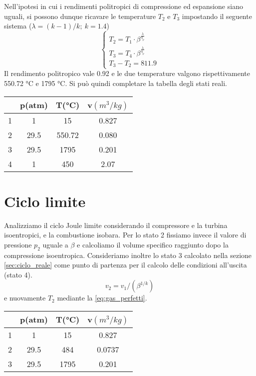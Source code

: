 \documentclass[a4paper,12pt]{article}
\begin{document}
Nell'ipotesi in cui i rendimenti politropici di compressione ed espansione siano uguali, si possono dunque ricavare le temperature $T_2$ e $T_3$ impostando il seguente sistema
($\lambda = (k-1)/k;\ k=1.4$)
$$
\begin{cases}
    T_2 = T_1\cdot\beta^{\frac{\lambda}{\eta_p}} \\
    T_3 = T_4\cdot\beta^{\frac{\lambda}{\eta_p}}\\
    T_3-T_2 = 811.9
\end{cases}
$$
Il rendimento politropico vale 0.92 e le due temperature valgono rispettivamente 550.72 °C e 1795 °C.
Si può quindi completare la tabella degli stati reali.
\begin{center}
    \begin{tabular}{c|c|c|c}
            &p(atm) &T(°C)  &v$(m^3/kg)$     \\ \hline
        1   &    1  & 15    & 0.827   \\
        2   &   29.5&550.72 & 0.080   \\
        3   &   29.5&1795   & 0.201   \\
        4   &   1   & 450   & 2.07
    \end{tabular}
\end{center}

\section{Ciclo limite}
\label{sec:ciclo_limite}
Analizziamo il ciclo Joule limite considerando il compressore e la turbina isoentropici, e la combustione isobara.
Per lo stato 2 fissiamo invece il valore di pressione $p_2$ uguale a $\beta$ e calcoliamo il volume specifico raggiunto dopo la compressione isoentropica.
Consideriamo inoltre lo stato 3 calcolato nella sezione \ref{sec:ciclo_reale} come punto di partenza per il calcolo delle condizioni all'uscita (stato 4).
\begin{equation*}
    v_2 = v_1/(\beta^{1/k})
\end{equation*}
e nuovamente $T_2$ mediante la \eqref{eq:gas_perfetti}.
\begin{center}
    \begin{tabular}{c|c|c|c}
            &p(atm) &T(°C)  &v$(m^3/kg)$     \\ \hline
        1   &    1  & 15    & 0.827   \\
        2   &   29.5& 484   & 0.0737  \\
        3   &   29.5&1795   & 0.201   \\
    \end{tabular}
\end{center}
\end{document}
